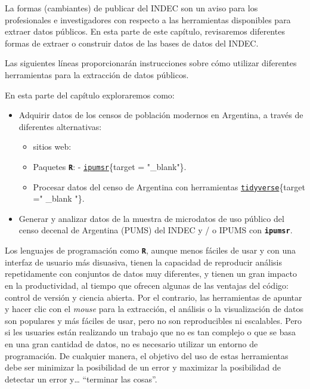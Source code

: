 \documentclass[
]{book}
\providecommand{\tightlist}{%
  \setlength{\itemsep}{0pt}\setlength{\parskip}{0pt}}
\begin{document}
La formas (cambiantes) de publicar del INDEC son un aviso para los profesionales e investigadores con respecto a las herramientas disponibles para extraer datos públicos. En esta parte de este capítulo, revisaremos diferentes formas de extraer o construir datos de las bases de datos del INDEC.

Las siguientes líneas proporcionarán instrucciones sobre cómo utilizar diferentes herramientas para la extracción de datos públicos.

En esta parte del capítulo exploraremos como:

\begin{itemize}
\tightlist
\item
  Adquirir datos de los censos de población modernos en Argentina, a través de diferentes alternativas:

  \begin{itemize}
  \tightlist
  \item
    sitios web:
  \item
    Paquetes \textbf{\texttt{R}}:
    - \href{https://cran.r-project.org/web/packages/ipumsr/vignettes/ipums.html}{\texttt{ipumsr}}\{target = "\_blank"\}.
  \item
    Procesar datos del censo de Argentina con herramientas \href{https://www.tidyverse.org/}{\texttt{tidyverse}}\{target =" \_blank "\}.
  \end{itemize}
\item
  Generar y analizar datos de la muestra de microdatos de uso público del censo decenal de Argentina (PUMS) del INDEC y / o IPUMS con \textbf{\texttt{ipumsr}}.
\end{itemize}

Los lenguajes de programación como \textbf{\texttt{R}}, aunque menos fáciles de usar y con una interfaz de usuario más disuasiva, tienen la capacidad de reproducir análisis repetidamente con conjuntos de datos muy diferentes, y tienen un gran impacto en la productividad, al tiempo que ofrecen algunas de las ventajas del código: control de versión y ciencia abierta. Por el contrario, las herramientas de apuntar y hacer clic con el \emph{mouse} para la extracción, el análisis o la visualización de datos son populares y más fáciles de usar, pero no son reproducibles ni escalables. Pero si les usuaries están realizando un trabajo que no es tan complejo o que se basa en una gran cantidad de datos, no es necesario utilizar un entorno de programación. De cualquier manera, el objetivo del uso de estas herramientas debe ser minimizar la posibilidad de un error y maximizar la posibilidad de detectar un error y\ldots{} ``terminar las cosas''.
\end{document}
